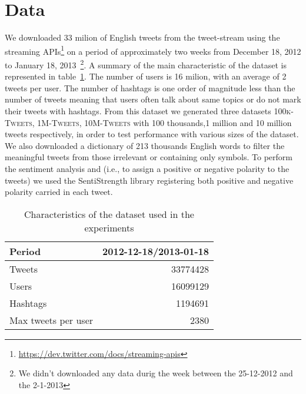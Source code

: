 \section{Data}
\label{sec:data}

We downloaded 33 milion of English tweets from the tweet-stream using the streaming APIs\footnote{\url{https://dev.twitter.com/docs/streaming-apis}} on a period of approximately two weeks from December 18, 2012 to January 18, 2013~\footnote{We didn't downloaded any data durig the week between the 25-12-2012 and the 2-1-2013}. 
A summary of the main characteristic of the dataset is represented in table~\ref{tbl:dataset}.
The number of users is 16 milion, with an average of 2 tweets per user. 
The number of hashtags is one order of magnitude less than the number of tweets meaning that users often talk about same topics or do not mark their tweets with hashtags.
From this dataset we generated three datasets \textsc{100k-Tweets}, \textsc{1M-Tweets}, \textsc{10M-Tweets} with 100 thousands,1 million and 10 million tweets respectively, in order to test performance with various sizes of the dataset. 
We also downloaded a dictionary of 213 thousands English words to filter the meaningful tweets from those irrelevant or containing only symbols. 
To perform the sentiment analysis and (i.e., to assign a positive or negative polarity to the tweets) we used the SentiStrength library registering both positive and negative polarity carried in each tweet. 

\begin{table}[htb]
\centering 
\begin{tabular}{|l|r|}
\hline		
Period			& 2012-12-18/2013-01-18\\
\hline
Tweets			&	33774428\\
Users 			&	16099129\\
Hashtags 		&	1194691\\
Max tweets per user & 2380\\  
\hline
\end{tabular}
\caption{Characteristics of the dataset used in the experiments}
\label{tbl:dataset}
\end{table}


